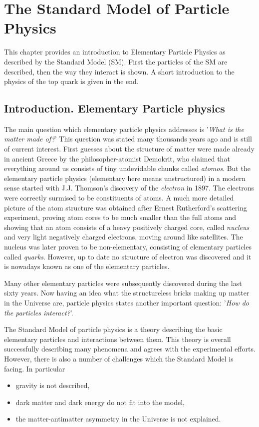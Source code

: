 \chapter{The Standard Model of Particle Physics}\label{chapt:SM}

This chapter provides an introduction to Elementary Particle Physics as described by the Standard Model (SM).
First the particles of the SM are described, then the way they interact is shown. A short introduction
to the physics of the top quark is given in the end.

\section{Introduction. Elementary Particle physics}

The main question which elementary particle physics addresses is '\textit{What is the matter made of?}'
This question was stated many thousands years ago and is still of current interest. First guesses about
the structure of matter were made already in ancient Greece by the philosopher-atomist Demokrit, who
claimed that everything around us consists of tiny undevidable chunks called \textit{atomos}\cite{yangcn}.
But the elementary particle physics (elementary here means unstructured) in a modern sense started with 
J.J. Thomson's discovery of the \textit{electron}\cite{jjthome} in 1897. The electrons were correctly surmised to be constituents
of atoms. A much more detailed picture of the atom structure was obtained after Ernest Rutherford's scattering experiment\cite{rutherford},
proving atom cores to be much smaller than the full atoms and showing that an atom consists of a heavy positively charged core, called 
\textit{nucleus} and very light negatively charged electrons, moving around like satellites. 
The nucleus was later proven to be non-elementary, consisting of elementary particles called \textit{quarks}. 
However, up to date no structure of electron was discovered 
and it is nowadays known as one of the elementary particles. 

Many other elementary particles were subsequently discovered during the last sixty years. Now having an idea 
what the structureless bricks making up matter in the Universe are, particle physics
states another important question: '\textit{How do the particles interact?}'.

The Standard Model of particle physics is a theory describing the basic elementary particles
and interactions between them. This theory is overall successfully describing many phenomena and 
agrees with the experimental efforts. However, there is also a number of challenges which the Standard Model
is facing. In particular
\begin{itemize}
 \item gravity is not described,
 \item dark matter and dark energy do not fit into the model,
 \item the matter-antimatter asymmetry in the Universe is not explained.
\end{itemize}


